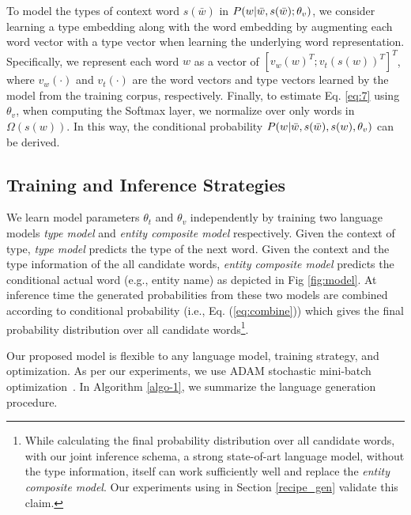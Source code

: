\documentclass[11pt,a4paper]{article}
\begin{document}
To model the types of context word $s(\bar{w})$ in $P(w|\Bar{w}, s(\bar{w}); \theta_v)$, we consider learning a type embedding along with the word embedding by augmenting each word vector with a type vector when learning the underlying word representation. Specifically, we represent each word $w$ as a vector of $[v_w(w)^T; v_t(s(w))^T]^T$, where $v_w(\cdot)$ and $v_t(\cdot)$ are the word vectors and type vectors learned by the model from the training corpus, respectively. 
Finally, to estimate Eq. \eqref{eq:7} using $\theta_v$, when computing the Softmax layer, we normalize over only words in $\Omega(s(w))$. In this way, the conditional probability 
$P(w|\Bar{w}, s(\bar{w}), s(w), \theta_v)$ can be derived. 












\subsection{Training and Inference Strategies}

We learn model parameters $\theta_t$ and $\theta_v$ independently by training two language models {\it type model} and {\it entity composite model} respectively. Given the context of type, {\it type model} predicts the type of the next word. Given the context and the type information of the all candidate words, {\it entity composite model} predicts the conditional actual word (e.g., entity name) as depicted in Fig \ref{fig:model}. At inference time the generated probabilities from these two models are combined according to conditional probability (i.e., Eq. (\ref{eq:combine})) which gives the final probability distribution over all candidate words\footnote{While calculating the final probability distribution over all candidate words, with our joint inference schema, a strong state-of-art language model, without the type information, itself can work sufficiently well and replace the {\it entity composite model}. Our experiments using \cite{socher} in Section \ref{recipe_gen} validate this claim.}. 


Our proposed model is flexible to any language model, training strategy, and optimization. As per our experiments, we use ADAM stochastic mini-batch optimization~\cite{adam}. 
In Algorithm \ref{algo-1}, we summarize the language generation procedure.  
\end{document}
